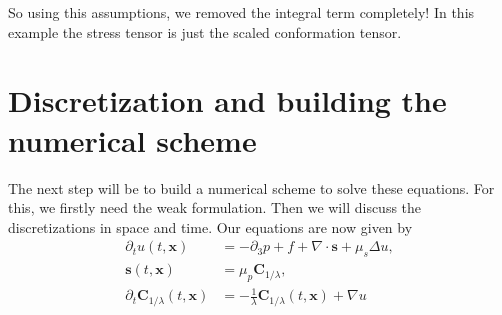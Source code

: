 \documentclass[12pt,a4paper,twoside, open=right]{scrreprt}
\theoremstyle{definition}
\theoremstyle{plain}
\newcommand{\bfs}{\bm{s}}
\newcommand{\bfC}{\bm{C}}
\newcommand{\bfx}{\bm{x}}
\begin{document}
So using this assumptions, we removed the integral term completely! In this example the stress tensor is just the scaled conformation tensor. 
\chapter{Discretization and building the numerical scheme}
The next step will be to build a numerical scheme to solve these equations. For this, we firstly need the weak formulation. Then we will discuss the discretizations in space and time. Our equations are now given by 
\begin{align}
    \label{eq:transfeq1}
    \partial_t u(t,\bfx) &= -\partial_3 p + f +\nabla\cdot \bfs+\mu_s\Delta u,\\
    \label{eq:transfeq2}
    \bfs(t,\bfx)&=\mu_p\bfC_{1/\lambda},\\
    \partial_t\bfC_{1/\lambda}(t,\bfx) &= -\frac{1}{\lambda}\bfC_{1/\lambda}(t,\bfx)+\nabla u
    \label{eq:transfeq3}
\end{align}
\end{document}
